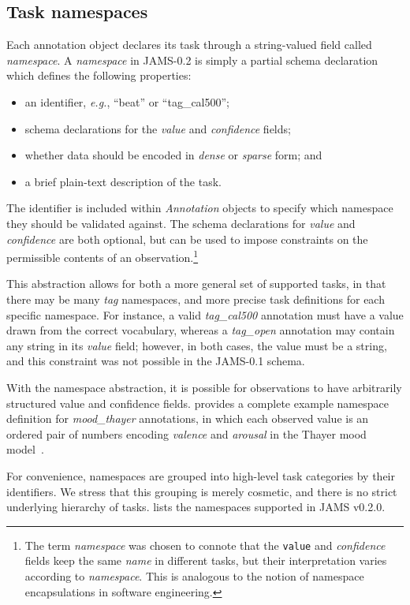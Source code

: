 \documentclass{article}
\begin{document}
\subsection{Task namespaces}\label{sec:schema:namespace}
Each annotation object declares its task through a string-valued field called \emph{namespace}.
A \emph{namespace} in JAMS-0.2 is simply a partial schema declaration which defines the following properties:
\begin{itemize}
    \setlength\itemsep{0em}
    \item an identifier, \emph{e.g.}, ``beat'' or ``tag\_cal500'';
    \item schema declarations for the \emph{value} and \emph{confidence} fields;
    \item whether data should be encoded in \emph{dense} or \emph{sparse} form; and
    \item a brief plain-text description of the task.
\end{itemize}
The identifier is included within \emph{Annotation} objects to specify which namespace they should be validated against.
The schema declarations for \emph{value} and \emph{confidence} are both optional, but can be used to impose constraints on the permissible
contents of an observation.\footnote{The term \emph{namespace} was chosen to connote that
the \texttt{value} and \emph{confidence} fields keep the same \emph{name} in different
tasks, but their interpretation varies according to \emph{namespace}.  This is analogous
to the notion of namespace encapsulations in software engineering.}

This abstraction allows for both a more general set of supported tasks, in that there may be many \emph{tag} namespaces, 
and more precise task definitions for each specific namespace.
For instance, a valid \emph{tag\_cal500} annotation must have a value drawn from the correct vocabulary, whereas a \emph{tag\_open}
annotation may contain any string in its \emph{value} field; however, in both cases, the value must be a string, and this constraint was
not possible in the JAMS-0.1 schema.

With the namespace abstraction, it is possible for observations to have arbitrarily structured value and confidence fields.
 provides a complete example namespace definition for \emph{mood\_thayer} annotations, in which each observed value is an ordered pair of numbers encoding \emph{valence}
and \emph{arousal} in the Thayer mood model~\cite{thayer}.

For convenience, namespaces are grouped into high-level task categories by their identifiers.
We stress that this grouping is merely cosmetic, and there is no strict underlying hierarchy of tasks.
 lists the namespaces supported in JAMS v0.2.0.
\end{document}
